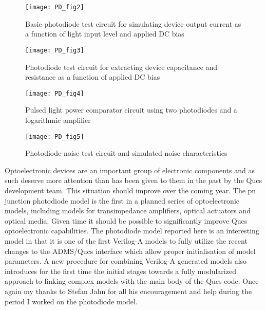 \newpage
{}
\begin{figure} [h]
  \centering
	\texttt{[image: PD\_fig2]}
        \caption{Basic photodiode test circuit for simulating device output current as a function of light input level and applied DC bias  }
  \label{fig:PD2}
\end{figure} 

\begin{figure}
  \centering
	\texttt{[image: PD\_fig3]}
        \caption{Photodiode test circuit for extracting device capacitance and resistance as a function of applied DC bias  }
  \label{fig:PD3}
\end{figure} 

\begin{figure} 
  \centering
	\texttt{[image: PD\_fig4]}
        \caption{Pulsed light power comparator circuit using two photodiodes and a logarithmic amplifier  }
  \label{fig:PD4}
\end{figure} 

\begin{figure}
  \centering
	\texttt{[image: PD\_fig5]}
        \caption{Photodiode noise test circuit and simulated noise characteristics  }
  \label{fig:PD5}
\end{figure} 




Optoelectronic devices are an important group of electronic components
and as such deserve more attention than has been given to them in the
past by the Qucs development team.  This situation should improve over
the coming year. The pn junction photodiode model is the first in a
planned series of optoelectronic models, including models for
transimpedance amplifiers, optical actuators and optical media. Given
time it should be possible to significantly improve Qucs
optoelectronic capabilities.  The photodiode model reported here is an
interesting model in that it is one of the first Verilog-A models to
fully utilize the recent changes to the ADMS/Qucs interface which
allow proper initialisation of model parameters. A new procedure for
combining Verilog-A generated models also introduces for the first
time the initial stages towards a fully modularized approach to
linking complex models with the main body of the Qucs code.  Once
again my thanks to Stefan Jahn for all his encouragement and help
during the period I worked on the photodiode model.



